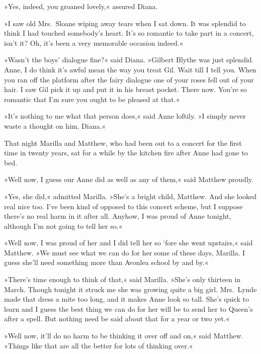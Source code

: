 »Yes, indeed, you groaned lovely,« assured Diana.

»I saw old Mrs.~Sloane wiping away tears when I sat down. It was splendid to think I had touched somebody's heart. It's so romantic to take part in a concert, isn't it? Oh, it's been a very memorable occasion indeed.«

»Wasn't the boys' dialogue fine?« said Diana. »Gilbert Blythe was just splendid. Anne, I do think it's awful mean the way you treat Gil. Wait till I tell you. When you ran off the platform after the fairy dialogue one of your roses fell out of your hair. I saw Gil pick it up and put it in his breast pocket. There now. You're so romantic that I'm sure you ought to be pleased at that.«

»It's nothing to me what that person does,« said Anne loftily. »I simply never waste a thought on him, Diana.«

That night Marilla and Matthew, who had been out to a concert for the first time in twenty years, sat for a while by the kitchen fire after Anne had gone to bed.

»Well now, I guess our Anne did as well as any of them,« said Matthew proudly.

»Yes, she did,« admitted Marilla. »She's a bright child, Matthew. And she looked real nice too. I've been kind of opposed to this concert scheme, but I suppose there's no real harm in it after all. Anyhow, I was proud of Anne tonight, although I'm not going to tell her so.«

»Well now, I was proud of her and I did tell her so ‘fore she went upstairs,« said Matthew. »We must see what we can do for her some of these days, Marilla. I guess she'll need something more than Avonlea school by and by.«

»There's time enough to think of that,« said Marilla. »She's only thirteen in March. Though tonight it struck me she was growing quite a big girl. Mrs.~Lynde made that dress a mite too long, and it makes Anne look so tall. She's quick to learn and I guess the best thing we can do for her will be to send her to Queen's after a spell. But nothing need be said about that for a year or two yet.«

»Well now, it'll do no harm to be thinking it over off and on,« said Matthew. »Things like that are all the better for lots of thinking over.«